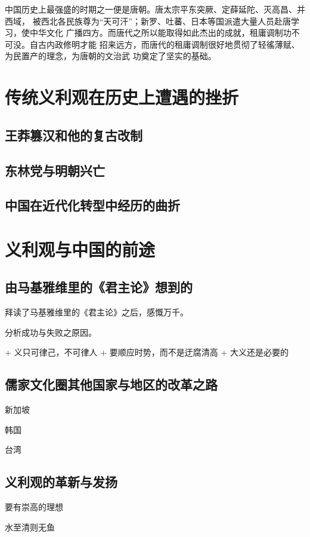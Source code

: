 中国历史上最强盛的时期之一便是唐朝。唐太宗平东突厥、定薛延陀、灭高昌、并西域，
被西北各民族尊为“天可汗”；新罗、吐蕃、日本等国派遣大量人员赴唐学习，使中华文化
广播四方。而唐代之所以能取得如此杰出的成就，租庸调制功不可没。自古内政修明才能
招来远方，而唐代的租庸调制很好地贯彻了轻徭薄赋、为民置产的理念，为唐朝的文治武
功奠定了坚实的基础。



\section{传统义利观在历史上遭遇的挫折}

\subsection{王莽篡汉和他的复古改制}

\subsection{东林党与明朝兴亡}

\subsection{中国在近代化转型中经历的曲折}

\section{义利观与中国的前途}

\subsection{由马基雅维里的《君主论》想到的}

拜读了马基雅维里的《君主论》之后，感慨万千。

分析成功与失败之原因。

+ 义只可律己，不可律人
+ 要顺应时势，而不是迂腐清高
+ 大义还是必要的

\subsection{儒家文化圈其他国家与地区的改革之路}

新加坡

韩国

台湾

\subsection{义利观的革新与发扬}

要有崇高的理想

水至清则无鱼

\printbibliography
\nocite{*}


